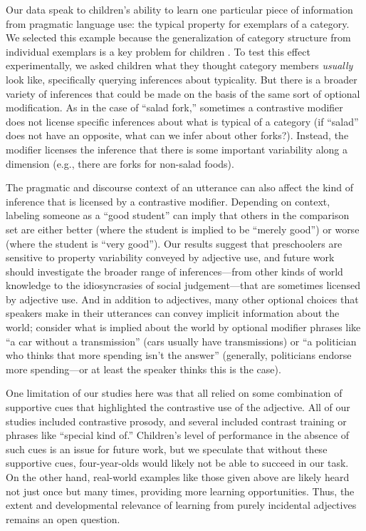 \documentclass[man]{apa2}
\begin{document}
Our data speak to children's ability to learn one particular piece of information from pragmatic language use: the typical property for exemplars of a category. We selected this example because the generalization of category structure from individual exemplars is a key problem for children \cite{markman1991}. To test this effect experimentally, we asked children what they thought category members \emph{usually} look like, specifically querying inferences about typicality. But there is a broader variety of inferences that could be made on the basis of the same sort of optional modification. As in the case of ``salad fork,'' sometimes a contrastive modifier does not license specific inferences about what is typical of a category (if ``salad'' does not have an opposite, what can we infer about other forks?). Instead, the modifier licenses the inference that there is some important variability along a dimension (e.g., there are forks for non-salad foods). 

The pragmatic and discourse context of an utterance can also affect the kind of inference that is licensed by a contrastive modifier. Depending on context, labeling someone as a ``good student'' can imply that others in the comparison set are either better (where the student is implied to be ``merely good'') or worse (where the student is ``very good''). Our results suggest that preschoolers are sensitive to property variability conveyed by adjective use, and future work should investigate the broader range of inferences---from other kinds of world knowledge to the idiosyncrasies of social judgement---that are sometimes licensed by adjective use. And in addition to adjectives, many other optional choices that speakers make in their utterances can convey implicit information about the world; consider what is implied about the world by optional modifier phrases like ``a car without a transmission'' (cars usually have transmissions) or ``a politician who thinks that more spending isn't the answer'' (generally, politicians endorse more spending---or at least the speaker thinks this is the case). 

One limitation of our studies here was that all relied on some combination of supportive cues that highlighted the contrastive use of the adjective. All of our studies included contrastive prosody, and several included contrast training or phrases like ``special kind of.'' Children's level of performance in the absence of such cues is an issue for future work, but we speculate that without these supportive cues, four-year-olds would likely not be able to succeed in our task. On the other hand, real-world examples like those given above are likely heard not just once but many times, providing more learning opportunities. Thus, the extent and developmental relevance of learning from purely incidental adjectives remains an open question. 
\end{document}
